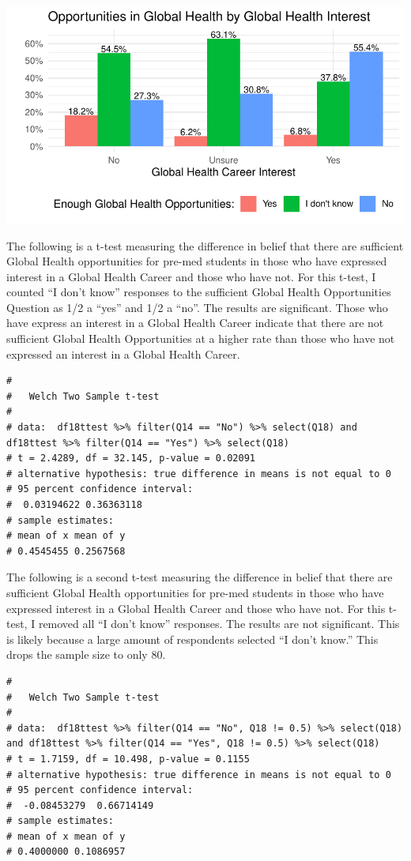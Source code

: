 \documentclass[
  letterpaper,
  DIV=11,
  numbers=noendperiod]{scrartcl}
\begin{document}
\includegraphics{GlobalHealthQuarto6-10_files/figure-pdf/unnamed-chunk-4-1.pdf}

\newpage

The following is a t-test measuring the difference in belief that there
are sufficient Global Health opportunities for pre-med students in those
who have expressed interest in a Global Health Career and those who have
not. For this t-test, I counted ``I don't know'' responses to the
sufficient Global Health Opportunities Question as 1/2 a ``yes'' and 1/2
a ``no''. The results are significant. Those who have express an
interest in a Global Health Career indicate that there are not
sufficient Global Health Opportunities at a higher rate than those who
have not expressed an interest in a Global Health Career.

\begin{verbatim}
# 
#   Welch Two Sample t-test
# 
# data:  df18ttest %>% filter(Q14 == "No") %>% select(Q18) and df18ttest %>% filter(Q14 == "Yes") %>% select(Q18)
# t = 2.4289, df = 32.145, p-value = 0.02091
# alternative hypothesis: true difference in means is not equal to 0
# 95 percent confidence interval:
#  0.03194622 0.36363118
# sample estimates:
# mean of x mean of y 
# 0.4545455 0.2567568
\end{verbatim}

The following is a second t-test measuring the difference in belief that
there are sufficient Global Health opportunities for pre-med students in
those who have expressed interest in a Global Health Career and those
who have not. For this t-test, I removed all ``I don't know'' responses.
The results are not significant. This is likely because a large amount
of respondents selected ``I don't know.'' This drops the sample size to
only 80.

\begin{verbatim}
# 
#   Welch Two Sample t-test
# 
# data:  df18ttest %>% filter(Q14 == "No", Q18 != 0.5) %>% select(Q18) and df18ttest %>% filter(Q14 == "Yes", Q18 != 0.5) %>% select(Q18)
# t = 1.7159, df = 10.498, p-value = 0.1155
# alternative hypothesis: true difference in means is not equal to 0
# 95 percent confidence interval:
#  -0.08453279  0.66714149
# sample estimates:
# mean of x mean of y 
# 0.4000000 0.1086957
\end{verbatim}
\end{document}
